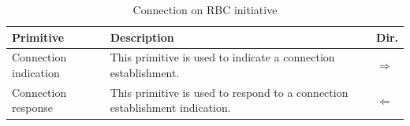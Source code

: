 \documentclass[nocc]{template/openetcs_report}
\begin{document}
			\begin{longtable}{|l|l|l|}
				\caption{Connection on RBC initiative}\\ 
				\hline
				
					\begin{minipage}[t]{0.3\linewidth} \textbf{Primitive}	\end{minipage}
				&	\begin{minipage}[t]{0.6\linewidth} \textbf{Description}	\end{minipage}
				&	\begin{minipage}[t]{0.1\linewidth} \textbf{Dir.} \end{minipage} \\
				
				\hline
				
					\begin{minipage}[t]{0.3\linewidth}Connection indication \end{minipage}
					&\begin{minipage}[t]{0.6\linewidth} This primitive is used to indicate a connection establishment.	\end{minipage}
					&\begin{minipage}[t]{0.1\linewidth} $\Rightarrow$ \end{minipage} \\
				
				\hline
								
					\begin{minipage}[t]{0.3\linewidth}Connection response \end{minipage}
					&\begin{minipage}[t]{0.6\linewidth} This primitive is used to respond to a connection establishment indication.	\end{minipage}
					&\begin{minipage}[t]{0.1\linewidth} $\Leftarrow$ \end{minipage} \\
				
				\hline									
			\end{longtable}
						
\end{document}
